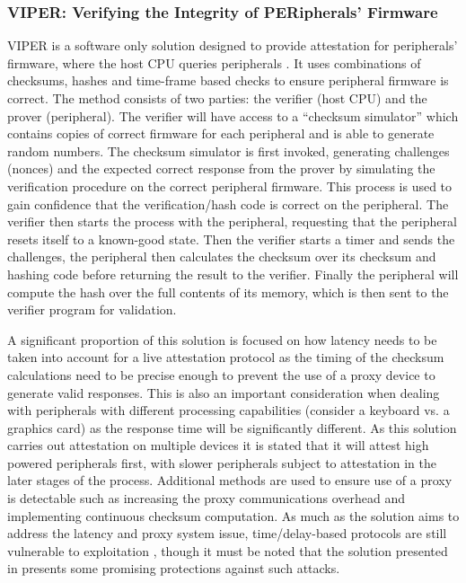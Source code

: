 \subsubsection*{VIPER: Verifying the Integrity of PERipherals' Firmware}

VIPER is a software only solution designed to provide attestation for peripherals' firmware, where the host CPU queries peripherals \cite{Li2011}. It uses combinations of checksums, hashes and time-frame based checks to ensure peripheral firmware is correct. The method consists of two parties: the verifier (host CPU) and the prover (peripheral). The verifier will have access to a ``checksum simulator'' which contains copies of correct firmware for each peripheral and is able to generate random numbers. The checksum simulator is first invoked, generating challenges (nonces) and the expected correct response from the prover by simulating the verification procedure on the correct peripheral firmware. This process is used to gain confidence that the verification\slash hash code is correct on the peripheral. The verifier then starts the process with the peripheral, requesting that the peripheral resets itself to a known-good state. Then the verifier starts a timer and sends the challenges, the peripheral then calculates the checksum over its checksum and hashing code before returning the result to the verifier. Finally the peripheral will compute the hash over the full contents of its memory, which is then sent to the verifier program for validation.

A significant proportion of this solution is focused on how latency needs to be taken into account for a live attestation protocol as the timing of the checksum calculations need to be precise enough to prevent the use of a proxy device to generate valid responses. This is also an important consideration when dealing with peripherals with different processing capabilities (consider a keyboard vs. a graphics card) as the response time will be significantly different. As this solution carries out attestation on multiple devices it is stated that it will attest high powered peripherals first, with slower peripherals subject to attestation in the later stages of the process. Additional methods are used to ensure use of a proxy is detectable such as increasing the proxy communications overhead and implementing continuous checksum computation. As much as the solution aims to address the latency and proxy system issue, time\slash delay-based protocols are still vulnerable to exploitation \cite{Castelluccia2009}, though it must be noted that the solution presented in \cite{Li2011} presents some promising protections against such attacks.

